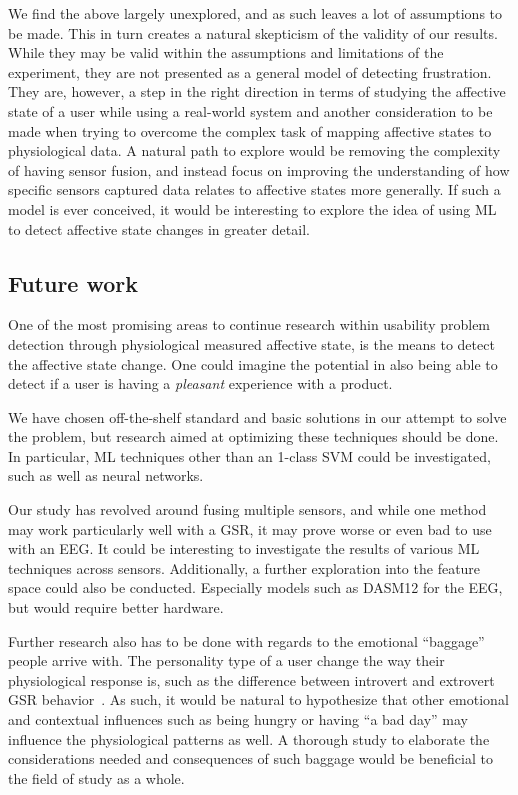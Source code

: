 We find the above largely unexplored, and as such leaves a lot of assumptions to be made.
This in turn creates a natural skepticism of the validity of our results.
While they may be valid within the assumptions and limitations of the experiment, they are not presented as a general model of detecting frustration. 
They are, however, a step in the right direction in terms of studying the affective state of a user while using a real-world system and another consideration to be made when trying to overcome the complex task of mapping affective states to physiological data. 
A natural path to explore would be removing the complexity of having sensor fusion, and instead focus on improving the understanding of how specific sensors captured data relates to affective states more generally. 
If such a model is ever conceived, it would be interesting to explore the idea of using ML to detect affective state
changes in greater detail.

\subsection{Future work}
One of the most promising areas to continue research within usability problem detection through physiological measured
affective state, is the means to detect the affective state change. One could imagine the potential in also being able
to detect if a user is having a \textit{pleasant} experience with a product.

We have chosen off-the-shelf standard and basic solutions in our attempt to solve the problem, but research aimed at optimizing these techniques should be done. 
In particular, ML techniques other than an 1-class SVM could be investigated, such as well as neural networks.

Our study has revolved around fusing multiple sensors, and while one method may work particularly well with a GSR, it may prove worse or even bad to use with an EEG. 
It could be interesting to investigate the results of various ML techniques across sensors.
Additionally, a further exploration into the feature space could also be conducted. 
Especially models such as DASM12\cite{eeg_music_listening} for the EEG, but would require better hardware.

Further research also has to be done with regards to the emotional ``baggage'' people arrive with. 
The personality type of a user change the way their physiological response is, such as the difference between introvert and extrovert GSR behavior~\cite{Foglia20081814}.
As such, it would be natural to hypothesize that other emotional and contextual influences such as being hungry or having ``a bad day'' may influence the physiological patterns as well. 
A thorough study to elaborate the considerations needed and consequences of such baggage would be beneficial to the field of study as a whole. 